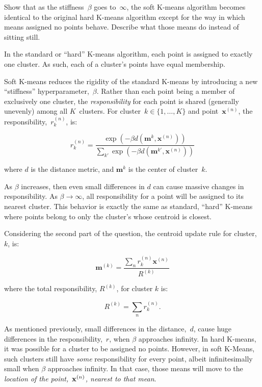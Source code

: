 \newpage
\begin{problem}{20}{2}{2}
  Show that as the stiffness~$\beta$ goes to~$\infty$, the soft K-means algorithm becomes identical to the original hard K-means algorithm except for the way in which means assigned no points behave.  Describe what those means do instead of sitting still.
\end{problem}

In the standard or ``hard'' K-means algorithm, each point is assigned to exactly one cluster.  As such, each of a cluster's points have equal membership.

Soft K-means reduces the rigidity of the standard K-means by introducing a new ``stiffness'' hyperparameter,~$\beta$.  Rather than each point being a member of exclusively one cluster, the \textit{responsibility} for each point is shared (generally unevenly) among all $K$~clusters.  For cluster~$k\in\{1,\ldots,K\}$ and point~$\textbf{x}^{(n)}$, the responsibility,~$r_{k}^{(n)}$, is:

\[ r_{k}^{(n)} = \frac{\exp(-\beta d(\textbf{m}^{k}, \textbf{x}^{(n)}))}{\sum_{k'} \exp(-\beta d(\textbf{m}^{k'}, \textbf{x}^{(n)}))} \]

\noindent
where $d$ is the distance metric, and $\textbf{m}^{k}$ is the center of cluster~$k$.

As $\beta$ increases, then even small differences in $d$ can cause massive changes in responsibility.  As ${\beta \rightarrow \infty}$, all responsibility for a point will be assigned to its nearest cluster.  This behavior is exactly the same as standard, ``hard'' K-means where points belong to only the cluster's whose centroid is closest.

Considering the second part of the question, the centroid update rule for cluster,~$k$, is:

\[ \mathbf{m}^{(k)} = \frac{\sum_{n}r^{(n)}_k \mathbf{x}^{(n)}}{R^{(k)}} \]

\noindent
where the total responsibility, $R^{(k)}$, for cluster $k$ is:

\[ R^{(k)}=\sum_{n} r_{k}^{(n)} \text{.} \]

As mentioned previously, small differences in the distance,~$d$, cause huge differences in the responsibility,~$r$, when $\beta$ approaches infinity.  In hard K-means, it was possible for a cluster to be assigned no points.  However, in soft K-Means, such clusters still have \textit{some} responsibility for every point, albeit infinitesimally small when $\beta$ approaches infinity.  In that case, those means will move to the \textit{location of the point,~$\textnormal{\textbf{x}}^{(n)}$, nearest to that mean}.
